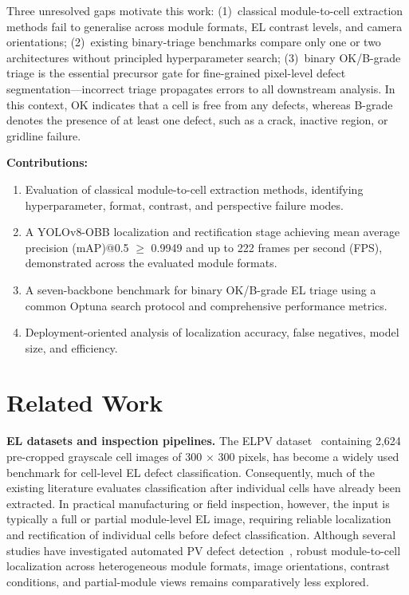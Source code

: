 \documentclass[conference]{IEEEtran}
\begin{document}
Three unresolved gaps motivate this work: (1)~classical module-to-cell extraction methods fail to generalise across module formats, EL contrast levels, and camera orientations; (2)~existing binary-triage benchmarks compare only one or two architectures without principled hyperparameter search; (3)~binary OK/B-grade triage is the essential precursor gate for fine-grained pixel-level defect segmentation---incorrect triage propagates errors to all downstream analysis. In this context, OK indicates that a cell is free from any defects, whereas B-grade denotes the presence of at least one defect, such as a crack, inactive region, or gridline failure.

\textbf{Contributions:}
\begin{enumerate}
  \item Evaluation of classical module-to-cell extraction methods, identifying hyperparameter, format, contrast, and perspective failure modes.
  \item A YOLOv8-OBB localization and rectification stage achieving mean average precision (mAP)@0.5 $\geq$ 0.9949 and up to 222 frames per second (FPS), demonstrated across the evaluated module formats.
  \item A seven-backbone benchmark for binary OK/B-grade EL triage using a common Optuna search protocol and comprehensive performance metrics.
  \item Deployment-oriented analysis of localization accuracy, false negatives, model size, and efficiency.
\end{enumerate}

\section{Related Work}
\label{sec:related}

\textbf{EL datasets and inspection pipelines.} The ELPV dataset~\cite{deitsch2019} containing 2{,}624 pre-cropped grayscale cell images of 300 × 300 pixels, has become a widely used benchmark for cell-level EL defect classification. Consequently, much of the existing literature evaluates classification after individual cells have already been extracted. In practical manufacturing or field inspection, however, the input is typically a full or partial module-level EL image, requiring reliable localization and rectification of individual cells before defect classification. Although several studies have investigated automated PV defect detection~\cite{zhao2022, su2021, li2023, chen2024, wang2023}, robust module-to-cell localization across heterogeneous module formats, image orientations, contrast conditions, and partial-module views remains comparatively less explored.
\end{document}
